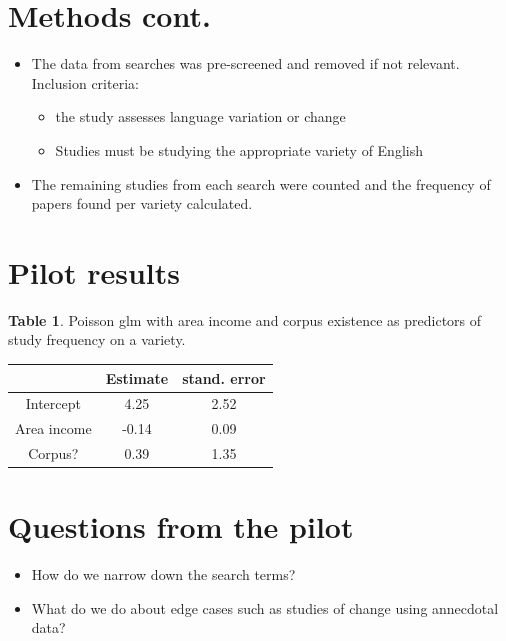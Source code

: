 \documentclass[a0paper,fleqn]{betterposter}
\begin{document}
{
	\section{Methods cont.}	
\begin{itemize}
	\item The data from searches was pre-screened and removed if not relevant. Inclusion criteria:
	\begin{itemize}
		\item the study assesses language variation or change
		\item Studies must be studying the appropriate variety of English
	\end{itemize}
	\item The remaining studies from each search were counted and the frequency of papers found per variety calculated.

\end{itemize}



\section{Pilot results}


\textbf{Table 1}. Poisson glm with area income and corpus existence as predictors of study frequency on a variety.

\begin{tabular}{ c c c }
	& Estimate & stand. error\\
	\hline
	Intercept & 4.25 & 2.52	\\
	Area income & -0.14 & 0.09\\
	Corpus? & 0.39 & 1.35 \\
\hline
\end{tabular}

\section{Questions from the pilot}
\begin{itemize}
	\item How do we narrow down the search terms?
	\item What do we do about edge cases such as studies of change using annecdotal data?
\end{itemize}



}
\end{document}
